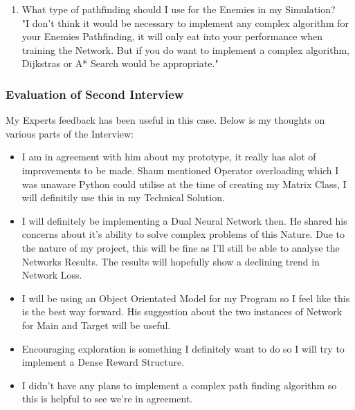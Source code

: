 \begin{flushleft}
\begin{enumerate}
                    \item What type of pathfinding should I use for the Enemies in my Simulation? \\
                        \vspace{0.2cm}
                        "I don't think it would be necessary to implement any complex algorithm for your Enemies Pathfinding, it will only eat 
                        into your performance when training the Network. But if you do want to implement a complex algorithm, Dijkstras or A* Search 
                        would be appropriate."
                \end{enumerate}
            \subsubsection{Evaluation of Second Interview}
                My Experts feedback has been useful in this case. Below is my thoughts on various parts of the Interview:
                
                \begin{itemize}
                    \item I am in agreement with him about my prototype, it really has alot of improvements to be made. Shaun mentioned Operator 
                    overloading which I was unaware Python could utilise at the time of creating my Matrix Class, I will definitily use this in 
                    my Technical Solution. 

                    \item I will definitely be implementing a Dual Neural Network then. He shared his concerns about it's ability to solve complex 
                    problems of this Nature. Due to the nature of my project, this will be fine as I'll still be able to analyse the Networks Results.
                    The results will hopefully show a declining trend in Network Loss.

                    \item I will be using an Object Orientated Model for my Program so I feel like this is the best way forward. His suggestion 
                    about the two instances of Network for Main and Target will be useful.

                    \item Encouraging exploration is something I definitely want to do so I will try to implement a Dense Reward Structure.
                    
                    \item I didn't have any plans to implement a complex path finding algorithm so this is helpful to see we're in agreement.


\end{itemize}
\end{flushleft}
